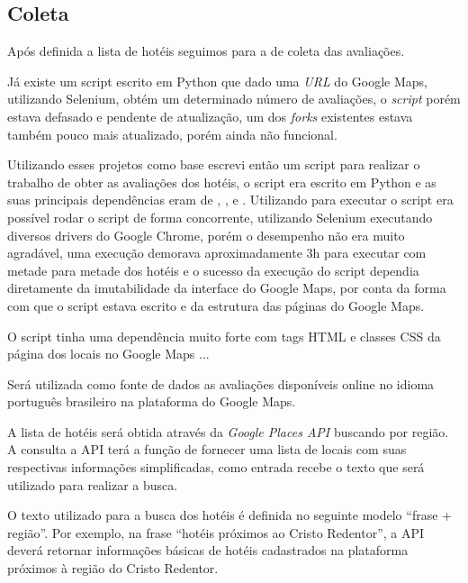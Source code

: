 

\subsection{Coleta}
\label{subsec:coleta}

Após definida a lista de hotéis seguimos para a de coleta das avaliações.

Já existe um script escrito em Python \cite{gaspa93scrapper2023} que dado uma \emph{URL} do Google Maps, utilizando Selenium, obtém um determinado número de avaliações, o \emph{script} porém estava defasado e pendente de atualização, um dos \emph{forks} existentes  estava também pouco mais atualizado, porém ainda não funcional.

Utilizando esses projetos como base escrevi então um script para realizar o trabalho de obter as avaliações dos hotéis, o script era escrito em Python e as suas principais dependências eram de \cite{selenium2023}, ,  e . Utilizando  para executar o script era possível rodar o script de forma concorrente, utilizando Selenium executando diversos drivers do Google Chrome, porém o desempenho não era muito agradável, uma execução demorava aproximadamente 3h para executar com metade para metade dos hotéis e o sucesso da execução do script dependia diretamente da imutabilidade da interface do Google Maps, por conta da forma com que o script estava escrito e da estrutura das páginas do Google Maps.

O script tinha uma dependência muito forte com tags HTML e classes CSS da página dos locais no Google Maps ...

Será utilizada como fonte de dados as avaliações disponíveis online no idioma português brasileiro na plataforma do Google Maps.

A lista de hotéis será obtida através da \emph{Google Places API} buscando por região. A consulta a API terá a função de fornecer uma lista de locais com suas respectivas informações simplificadas, como entrada recebe o texto que será utilizado para realizar a busca.

O texto utilizado para a busca dos hotéis é definida no seguinte modelo “frase + região”. Por exemplo, na frase “hotéis próximos ao Cristo Redentor”, a API deverá retornar informações básicas de hotéis cadastrados na plataforma próximos à região do Cristo Redentor.

